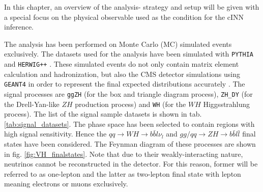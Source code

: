 \label{ch:analysis_strategy}

In this chapter, an overview of the analysis- strategy and setup will be given with a special focus on the physical observable used as the condition for the cINN inference.


The analysis has been performed on Monte Carlo (MC) simulated events exclusively. The datasets used for the analysis have been simulated with \texttt{PYTHIA} \cite{Sj_strand_2008} and \texttt{HERWIG++} \cite{herwig}. These simulated events do not only contain matrix element calculation and hadronization, but also the CMS detector simulations using \texttt{GEANT4} in order to represent the final expected distributions accurately \cite{geant1, geant2, geant3}.
The signal processes are \texttt{ggZH} (for the box and triangle diagram process), \texttt{ZH\_DY} (for the Drell-Yan-like $ZH$ production process) and \texttt{WH} (for the $WH$ Higgsstrahlung process). The list of the signal sample datasets is shown in tab. \ref{tab:signal_datasets}. The phase space has been selected to contain regions with high signal sensitivity. Hence the $qq \rightarrow WH \rightarrow b\bar{b} l\nu_l$ and $gg/qq \rightarrow ZH \rightarrow b\bar{b}l\bar{l}$ final states have been considered. The Feynman diagram of these processes are shown in fig. \ref{fig:VH_finalstates}. Note that due to their weakly-interacting nature, neutrinos cannot be reconstructed in the detector. For this reason, former will be referred to as one-lepton and the latter as two-lepton final state with lepton meaning electrons or muons exclusively.

